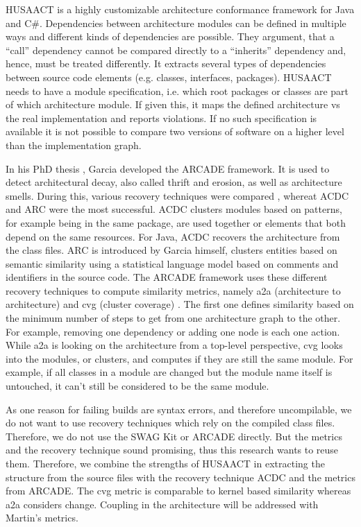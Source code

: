 \documentclass[conference]{IEEEtran}
\begin{document}
HUSAACT \cite{Husacct1,Husacct2} is a highly customizable architecture conformance framework for Java and C\#. Dependencies between architecture modules can be defined in multiple ways and different kinds of dependencies are possible. They argument, that a ``call'' dependency cannot be compared directly to a ``inherits'' dependency and, hence, must be treated differently. 
It extracts several types of dependencies between source code elements (e.g. classes, interfaces, packages). HUSAACT needs to have a module specification, i.e. which root packages or classes are part of which architecture module. If given this, it maps the defined architecture vs the real implementation and reports violations.
If no such specification is available it is not possible to compare two versions of software on a higher level than the implementation graph. 

In his PhD thesis \cite{arcade-thesis}, Garcia developed the ARCADE framework. It is used to detect architectural decay, also called thrift and erosion, as well as architecture smells. During this, various recovery techniques were compared \cite{arcRec-comparison}, whereat ACDC \cite{ACDC} and ARC were the most successful. 
ACDC clusters modules based on patterns, for example being in the same package, are used together or elements that both depend on the same resources. For Java, ACDC recovers the architecture from the class files. ARC is introduced by Garcia himself, clusters entities based on semantic similarity using a statistical language model based on comments and identifiers in the source code.
The ARCADE framework uses these different recovery techniques to compute similarity metrics, namely a2a (architecture to architecture) and cvg (cluster coverage) \cite{Arcade}. The first one defines similarity based on the minimum number of steps to get from one architecture graph to the other. For example, removing one dependency or adding one node is each one action. While a2a is looking on the architecture from a top-level perspective, cvg looks into the modules, or clusters, and computes if they are still the same module. For example, if all classes in a module are changed but the module name itself is untouched, it can't still be considered to be the same module.

As one reason for failing builds are syntax errors, and therefore uncompilable, we do not want to use recovery techniques which rely on the compiled class files. Therefore, we do not use the SWAG Kit or ARCADE directly.
But the metrics and the recovery technique sound promising, thus this research wants to reuse them. Therefore, we combine the strengths of HUSAACT in extracting the structure from the source files with the recovery technique ACDC and the metrics from ARCADE. The cvg metric is comparable to kernel based similarity whereas a2a considers change. Coupling in the architecture will be addressed with Martin's metrics.
\end{document}
